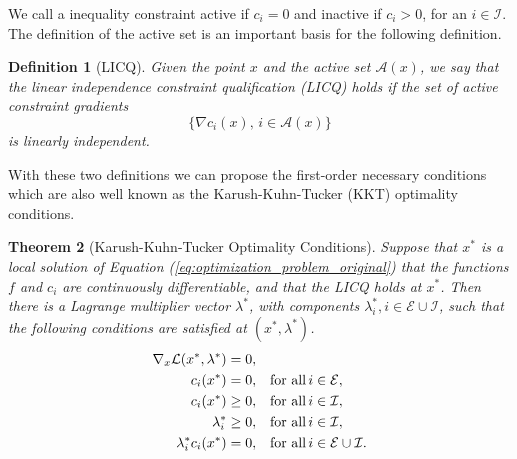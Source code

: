 \documentclass[abstracton]{scrreprt}
\newtheorem{theorem}{Theorem}[chapter]
\newtheorem{definition}[theorem]{Definition}
\begin{document}
        We call a inequality constraint active if $c_{i} = 0$ and inactive if $c_{i} > 0$, for an $i \in \mathcal{I}$. The definition of the active set is an important basis for the following definition.
        \begin{definition}[LICQ] %
            \label{def:licq}
            Given the point $x$ and the active set $\mathcal{A}(x)$, we say that the linear independence constraint qualification (LICQ) holds if the set of active constraint gradients
                $$
                    \{ \nabla c_{i}(x), \, i \in \mathcal{A}(x) \}
                $$
            is linearly independent.
        \end{definition}
        With these two definitions we can propose the first-order necessary conditions which are also well known as the Karush-Kuhn-Tucker (KKT) optimality conditions.
        \begin{theorem}[Karush-Kuhn-Tucker Optimality Conditions] %
        \label{the:kkt_conditions}
            Suppose that $x^{\ast}$ is a local solution of Equation (\ref{eq:optimization_problem_original}) that the
            functions $f$ and $c_{i}$ are continuously differentiable, and that the LICQ holds at $x^{\ast}$. Then there is a Lagrange multiplier vector $\lambda^{\ast}$, with components $\lambda_{i}^{\ast}, i \in \mathcal{E} \cup \mathcal{I}$, such that the following conditions are satisfied at $(x^{\ast}, \lambda^{\ast})$.
            \begin{subequations}
                \begin{align}
                    \nabla_{x}\mathcal{L}(x^{\ast}, \lambda^{\ast}) &= 0, \label{eq:stationarity} \\
                    c_{i}(x^{\ast}) &= 0, \,\,\,\,\, \textnormal{for all} \, i \in \mathcal{E}, \\
                    c_{i}(x^{\ast}) &\ge 0, \,\,\,\,\, \textnormal{for all} \, i \in \mathcal{I}, \\
                    \lambda_{i}^{\ast} &\ge 0, \,\,\,\,\, \textnormal{for all} \, i \in \mathcal{I}, \\
                    \lambda_{i}^{\ast}c_{i}(x^{\ast}) &= 0, \,\,\,\,\, \textnormal{for all} \, i \in \mathcal{E} \cup \mathcal{I}.\label{eq:complementary_conditions}
                \end{align}
                \label{eq:kkt_conditions}
            \end{subequations}
        \end{theorem}
\end{document}
